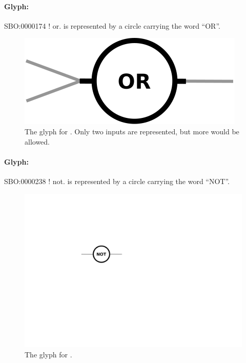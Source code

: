 \paragraph{Glyph: }\label{sec:or}

\begin{glyphDescription}
 \glyphSboTerm SBO:0000174 ! or.
 \glyphNode {} is represented by a circle carrying the word ``OR''.
 \end{glyphDescription}

\begin{figure}[H]
  \centering
  \includegraphics[scale = 0.5]{images/or}
  \caption{The \PD glyph for . Only two inputs are represented, but more would be allowed.}
  \label{fig:or}
\end{figure}


\paragraph{Glyph: }\label{sec:not}

\begin{glyphDescription}
 \glyphSboTerm SBO:0000238 ! not.
 \glyphNode {} is represented by a circle carrying the word ``NOT''.
 \end{glyphDescription}

\begin{figure}[H]
  \centering
  \includegraphics[scale = 0.5]{images/not}
  \caption{The \PD glyph for .}
  \label{fig:not}
\end{figure}

